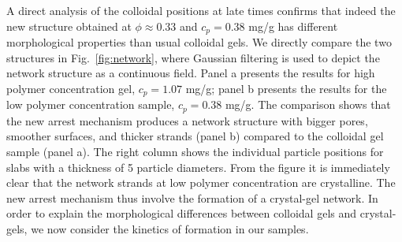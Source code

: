 \documentclass[preprint,amsmath,amssymb,superscriptaddress]{revtex4-1}
\begin{document}
A direct analysis of the colloidal positions at late times confirms that indeed the new structure obtained at
$\phi\approx 0.33$ and $c_p=0.38$ mg/g has different morphological properties than usual colloidal gels.
We directly compare the two structures in Fig.~\ref{fig:network}, where Gaussian filtering is used to depict the network structure as a continuous field.
Panel a presents the results for high
polymer concentration gel, $c_p=1.07$ mg/g; panel b presents the results for the low polymer concentration sample, $c_p=0.38$ mg/g.
The comparison shows that the new arrest mechanism produces a network structure with bigger pores, smoother surfaces, and thicker strands (panel b) compared
to the colloidal gel sample (panel a). The right column shows the individual particle positions for slabs with a thickness of 5 particle diameters. 
From the figure it is immediately clear that the network strands at low polymer concentration are crystalline. The new arrest mechanism thus
involve the formation of a crystal-gel network. In order to explain the morphological differences between colloidal gels and crystal-gels,
we now consider the kinetics of formation in our samples. 
\end{document}
